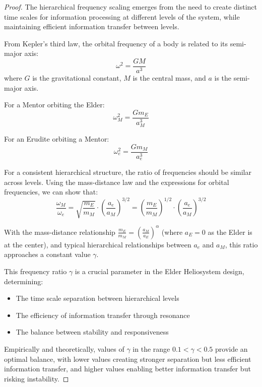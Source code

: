 \begin{proof}
The hierarchical frequency scaling emerges from the need to create distinct time scales for information processing at different levels of the system, while maintaining efficient information transfer between levels.

From Kepler's third law, the orbital frequency of a body is related to its semi-major axis:
\begin{equation}
\omega^2 = \frac{GM}{a^3}
\end{equation}
where $G$ is the gravitational constant, $M$ is the central mass, and $a$ is the semi-major axis.

For a Mentor orbiting the Elder:
\begin{equation}
\omega_M^2 = \frac{Gm_E}{a_M^3}
\end{equation}

For an Erudite orbiting a Mentor:
\begin{equation}
\omega_e^2 = \frac{Gm_M}{a_e^3}
\end{equation}

For a consistent hierarchical structure, the ratio of frequencies should be similar across levels. Using the mass-distance law and the expressions for orbital frequencies, we can show that:
\begin{equation}
\frac{\omega_M}{\omega_e} = \sqrt{\frac{m_E}{m_M}} \cdot \left(\frac{a_e}{a_M}\right)^{3/2} = \left(\frac{m_E}{m_M}\right)^{1/2} \cdot \left(\frac{a_e}{a_M}\right)^{3/2}
\end{equation}

With the mass-distance relationship $\frac{m_E}{m_M} = \left(\frac{a_M}{a_E}\right)^{\alpha}$ (where $a_E = 0$ as the Elder is at the center), and typical hierarchical relationships between $a_e$ and $a_M$, this ratio approaches a constant value $\gamma$.

This frequency ratio $\gamma$ is a crucial parameter in the Elder Heliosystem design, determining:
\begin{itemize}
    \item The time scale separation between hierarchical levels
    \item The efficiency of information transfer through resonance
    \item The balance between stability and responsiveness
\end{itemize}

Empirically and theoretically, values of $\gamma$ in the range $0.1 < \gamma < 0.5$ provide an optimal balance, with lower values creating stronger separation but less efficient information transfer, and higher values enabling better information transfer but risking instability.
\end{proof}

